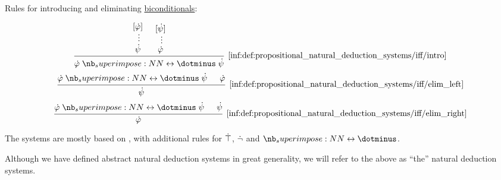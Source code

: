 \begin{definition}
\begin{thmenum}
    \mimprovised Rules for introducing and eliminating \hyperref[def:propositional_alphabet/connectives/biconditional]{biconditionals}:
    \begin{ThreeColumns}
      \begin{equation*}\taglabel[\( \leftrightarrow^+ \)]{inf:def:propositional_natural_deduction_systems/iff/intro}
        \begin{prooftree}
          \hypo{ [\syn\varphi] }
          \ellipsis {} { \syn\psi }
          \hypo{ [\syn\psi] }
          \ellipsis {} { \syn\varphi }
          \infer2[\ref{inf:def:propositional_natural_deduction_systems/iff/intro}]{ \syn\varphi \syniff \syn\psi }
        \end{prooftree}
      \end{equation*}
    \BeginSecondColumn
      \begin{equation*}\taglabel[\( \leftrightarrow^{-_L} \)]{inf:def:propositional_natural_deduction_systems/iff/elim_left}
        \begin{prooftree}
          \hypo{ \syn\varphi \syniff \syn\psi }
          \hypo{ \syn\varphi }
          \infer2[\ref{inf:def:propositional_natural_deduction_systems/iff/elim_left}]{ \syn\psi }
        \end{prooftree}
      \end{equation*}
    \BeginThirdColumn
      \begin{equation*}\taglabel[\( \leftrightarrow^{-_R} \)]{inf:def:propositional_natural_deduction_systems/iff/elim_right}
        \begin{prooftree}
          \hypo{ \syn\varphi \syniff \syn\psi }
          \hypo{ \syn\psi }
          \infer2[\ref{inf:def:propositional_natural_deduction_systems/iff/elim_right}]{ \syn\varphi }
        \end{prooftree}
      \end{equation*}
    \end{ThreeColumns}
  \end{thmenum}
\end{definition}
\begin{comments}
  \item The systems are mostly based on \cite[def. 2.1.1]{TroelstraSchwichtenberg2000}, with additional rules for \( \dot\top \), \( \dot\neg \) and \( \syniff \).
  \item Although we have defined abstract natural deduction systems in great generality, we will refer to the above as \enquote{the} natural deduction systems.
\end{comments}

